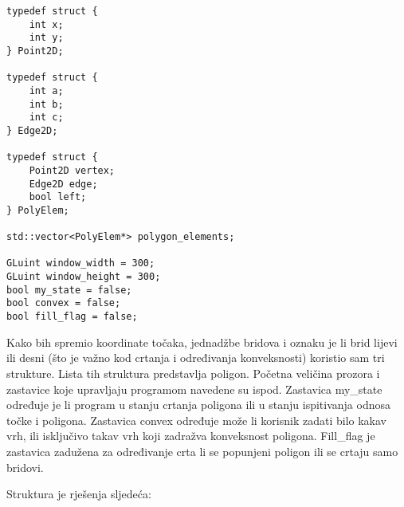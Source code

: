 \documentclass[utf8]{fer}
\begin{document}
\begin{lstlisting}
typedef struct {
    int x;
    int y;
} Point2D;

typedef struct {
    int a;
    int b;
    int c;
} Edge2D;

typedef struct {
    Point2D vertex;
    Edge2D edge;
    bool left;
} PolyElem;

std::vector<PolyElem*> polygon_elements;

GLuint window_width = 300;
GLuint window_height = 300;
bool my_state = false;
bool convex = false;
bool fill_flag = false;

\end{lstlisting}

Kako bih spremio koordinate točaka, jednadžbe bridova i oznaku je li brid lijevi ili desni (što je važno kod crtanja i određivanja konveksnosti) koristio sam tri strukture. Lista tih struktura predstavlja poligon. Početna veličina prozora i zastavice koje upravljaju programom navedene su ispod. Zastavica my\_state određuje je li program u stanju crtanja poligona ili u stanju ispitivanja odnosa točke i poligona. Zastavica convex određuje može li korisnik zadati bilo kakav vrh, ili isključivo takav vrh koji zadražva konveksnost poligona.  Fill\_flag je zastavica zadužena za određivanje crta li se popunjeni poligon ili se crtaju samo bridovi. 

Struktura je rješenja sljedeća:
\end{document}
